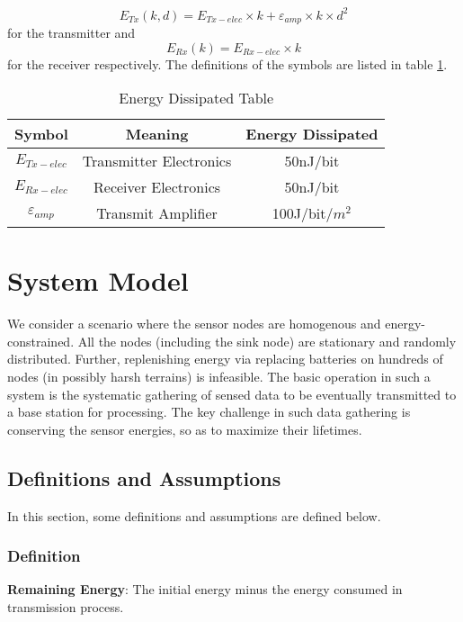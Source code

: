 \documentclass{elsarticle}
\begin{document}
\begin{equation}
E_{Tx}(k,d)=E_{Tx-elec} \times k + \varepsilon_{amp} \times k \times d^2
\end{equation}
for the transmitter and
\begin{equation}
E_{Rx}(k)=E_{Rx-elec} \times k
\end{equation}
for the receiver respectively. The definitions of the symbols are listed in table \ref{tabel1}.

\begin{table}
\centering
\caption{Energy Dissipated Table} \label{tabel1}
\begin{tabular}{c|c|c}
\hline
\textbf{Symbol} & \textbf{Meaning} & \textbf{Energy Dissipated} \\
\hline
$E_{Tx-elec}$ & Transmitter Electronics & 50nJ/bit \\
$E_{Rx-elec}$ & Receiver Electronics & 50nJ/bit \\
$\varepsilon_{amp}$ & Transmit Amplifier & 100J/bit/{$m^2$} \\
\hline
\end{tabular}
\end{table}

\section{System Model} \label{SystemModel}
We consider a scenario where the sensor nodes are homogenous and energy-constrained. All the nodes (including the sink node) are stationary and randomly distributed. Further, replenishing energy via replacing batteries on hundreds of nodes (in possibly harsh terrains) is infeasible. The basic operation in such a system is the systematic gathering of sensed data to be eventually transmitted to a base station for processing. The key challenge in such data gathering is conserving the sensor energies, so as to maximize their lifetimes.


\subsection{Definitions and Assumptions}
In this section, some definitions and assumptions are defined below.
\subsubsection{Definition}
\textbf{Remaining Energy}: The initial energy minus the energy consumed in transmission process.
\end{document}
